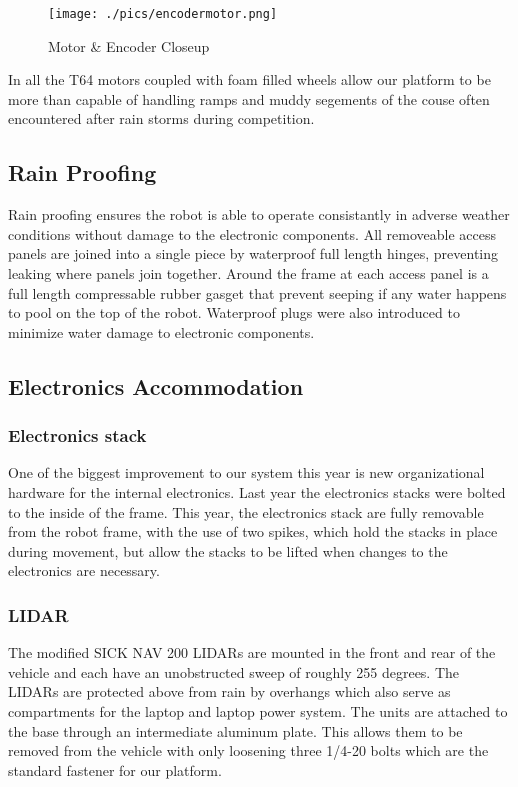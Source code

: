 \begin{figure}[H]
\begin{center}
\texttt{[image: ./pics/encodermotor.png]}
\caption{Motor \& Encoder Closeup}
\label{FIG:motorencoder}
\end{center}
\end{figure}

In all the T64 motors coupled with foam filled wheels allow our platform to be more than capable of handling ramps and muddy segements of the couse often encountered after rain storms during competition. 

\subsection{Rain Proofing}
Rain proofing ensures the robot is able to operate consistantly in adverse weather conditions without damage to the electronic components. All removeable access panels are joined into a single piece by waterproof full length hinges, preventing leaking where panels join together. Around the frame at each access panel is a full length compressable rubber gasget that prevent seeping if any water happens to pool on the top of the robot. Waterproof plugs were also introduced to minimize water damage to electronic components.

\subsection{Electronics Accommodation}
\subsubsection{Electronics stack}
One of the biggest improvement to our system this year is new organizational hardware for the internal electronics. Last year the electronics stacks were bolted to the inside of the frame. This year, the electronics stack are fully removable from the robot frame, with the use of two spikes, which hold the stacks in place during movement, but allow the stacks to be lifted when changes to the electronics are necessary.

\subsubsection{LIDAR}
The modified SICK NAV 200 LIDARs are mounted in the front and rear of the vehicle and each have an unobstructed sweep of roughly 255 degrees. The LIDARs are protected above from rain by overhangs which also serve as compartments for the laptop and laptop power system. The units are attached to the base through an intermediate aluminum plate. This allows them to be removed from the vehicle with only loosening three 1/4-20 bolts which are the standard fastener for our platform.
